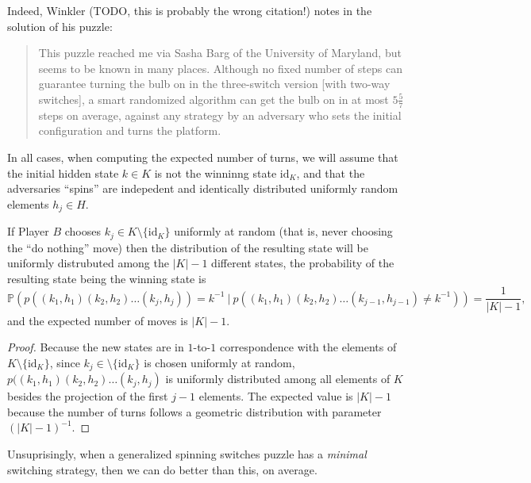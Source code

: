 Indeed, Winkler \cite{Winkler2004} (TODO, this is probably the wrong citation!)
notes in the solution of his puzzle:
\begin{quote}
  This puzzle reached me via Sasha Barg of the University of Maryland,
  but seems to be known in many places. Although no fixed number of steps
  can guarantee turning the bulb on in the three-switch version [with two-way switches],
  a smart randomized algorithm can get the bulb on in at most $5 \frac{5}{7}$
  steps on average, against any strategy by an adversary who sets the initial
  configuration and turns the platform. \cite{Winkler2021}
\end{quote}

%

%
In all cases, when computing the expected number of turns, we will assume that
the initial hidden state $k \in K$ is not the winninng state $\mathrm{id}_K$,
and that the adversaries ``spins'' are indepedent and identically distributed
uniformly random elements $h_j \in H$.

\begin{proposition}
  If Player $B$ chooses $k_j \in K \setminus \{\mathrm{id}_K\}$ uniformly at random
  (that is, never choosing the ``do nothing'' move) then the distribution
  of the resulting state will be uniformly distrubuted among the $|K| - 1$
  different states, the probability of the resulting state being the
  winning state is
  \[
    \mathbb{P}(p((k_1, h_1)(k_2, h_2)\dots(k_j, h_j))=k^{-1}\ |\ p((k_1, h_1)(k_2, h_2)\dots(k_{j-1}, h_{j-1})\neq k^{-1})) = \frac{1}{|K| - 1},
  \] and the expected number of moves is $|K| - 1$.
\end{proposition}
\begin{proof}
  Because the new states are in $1$-to-$1$ correspondence with the elements of
  $K \setminus \{\mathrm{id}_K\}$, since $k_j \in \setminus \{\mathrm{id}_K\}$
  is chosen uniformly at random, $p((k_1, h_1)(k_2, h_2)\dots(k_j, h_j)$
  is uniformly distributed among all elements of $K$ besides the projection of
  the first $j-1$ elements.
  The expected value is $|K| - 1$ because the number of turns follows a
  geometric distribution with parameter $(|K| - 1)^{-1}$.
\end{proof}

Unsuprisingly, when a generalized spinning switches puzzle has a
\textit{minimal} switching strategy, then we can do better than this, on average.

